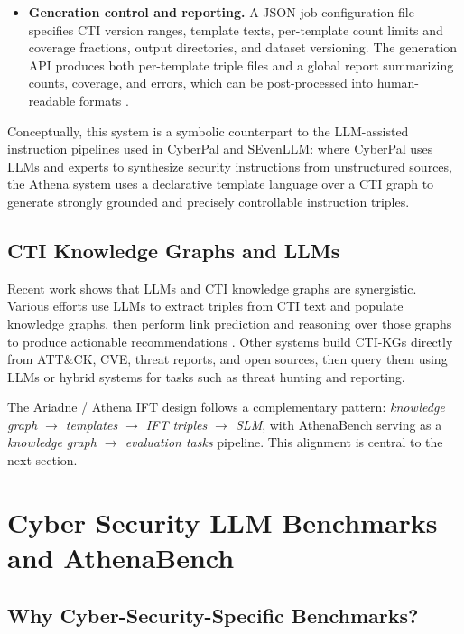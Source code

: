 \documentclass[unnumsec,webpdf,contemporary,large]{oup-authoring-template}
\theoremstyle{thmstyleone}
\theoremstyle{thmstyletwo}
\theoremstyle{thmstylethree}
\begin{document}
\begin{itemize}
  \item \textbf{Generation control and reporting.} A JSON job configuration file specifies CTI version ranges, template texts, per-template count limits and coverage fractions, output directories, and dataset versioning. The generation API produces both per-template triple files and a global report summarizing counts, coverage, and errors, which can be post-processed into human-readable formats \cite{cardei2025ift}.
\end{itemize}

Conceptually, this system is a symbolic counterpart to the LLM-assisted instruction pipelines used in CyberPal and SEvenLLM: where CyberPal uses LLMs and experts to synthesize security instructions from unstructured sources, the Athena system uses a declarative template language over a CTI graph to generate strongly grounded and precisely controllable instruction triples.

\subsection{CTI Knowledge Graphs and LLMs}

Recent work shows that LLMs and CTI knowledge graphs are synergistic. Various efforts use LLMs to extract triples from CTI text and populate knowledge graphs, then perform link prediction and reasoning over those graphs to produce actionable recommendations \cite{fieblinger2024kg,zhang2023cyberkg,wu2022opencykg,yu2024ctikg,zhao2024kctiaa}. Other systems build CTI-KGs directly from ATT\&CK, CVE, threat reports, and open sources, then query them using LLMs or hybrid systems for tasks such as threat hunting and reporting.

The Ariadne / Athena IFT design follows a complementary pattern: \emph{knowledge graph $\rightarrow$ templates $\rightarrow$ IFT triples $\rightarrow$ SLM}, with AthenaBench serving as a \emph{knowledge graph $\rightarrow$ evaluation tasks} pipeline. This alignment is central to the next section.

\section{Cyber Security LLM Benchmarks and AthenaBench}
\label{sec:benchmarks}

\subsection{Why Cyber-Security-Specific Benchmarks?}
\end{document}
